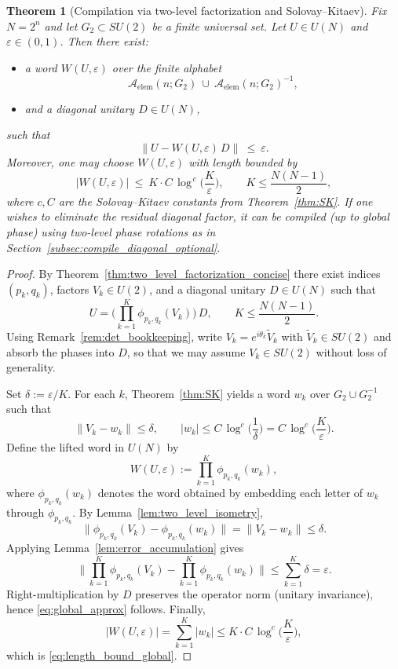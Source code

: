 \documentclass[10pt,a4paper]{amsart}
\newtheorem{theorem}{Theorem}
\begin{document}
\begin{theorem}[Compilation via two-level factorization and Solovay--Kitaev]
\label{thm:UN_compilation_SK}
Fix $N=2^n$ and let $G_2\subset SU(2)$ be a finite universal set.
Let $U\in U(N)$ and $\varepsilon\in(0,1)$. Then there exist:
\begin{itemize}
\item a word $W(U,\varepsilon)$ over the finite alphabet
\[
\mathcal{A}_{\mathrm{elem}}(n;G_2)\ \cup\ \mathcal{A}_{\mathrm{elem}}(n;G_2)^{-1},
\]
\item and a diagonal unitary $D\in U(N)$,
\end{itemize}
such that
\begin{equation}\label{eq:global_approx}
\big\|U - W(U,\varepsilon)\,D\big\|\ \le\ \varepsilon.
\end{equation}
Moreover, one may choose $W(U,\varepsilon)$ with length bounded by
\begin{equation}\label{eq:length_bound_global}
|W(U,\varepsilon)|\ \le\ K\cdot C\,\log^{\,c}\!\Big(\frac{K}{\varepsilon}\Big),
\qquad
K\le \frac{N(N-1)}{2},
\end{equation}
where $c,C$ are the Solovay--Kitaev constants from Theorem~\ref{thm:SK}.
If one wishes to eliminate the residual diagonal factor, it can be compiled (up to global phase) using two-level phase rotations as in
Section~\ref{subsec:compile_diagonal_optional}.
\end{theorem}

\begin{proof}
By Theorem~\ref{thm:two_level_factorization_concise} there exist indices $(p_k,q_k)$, factors $V_k\in U(2)$, and a diagonal unitary $D\in U(N)$
such that
\[
U=\Big(\prod_{k=1}^K \phi_{p_k,q_k}(V_k)\Big)\,D,
\qquad
K\le \frac{N(N-1)}{2}.
\]
Using Remark~\ref{rem:det_bookkeeping}, write $V_k=e^{i\theta_k}\widetilde V_k$ with $\widetilde V_k\in SU(2)$ and absorb the phases
into $D$, so that we may assume $V_k\in SU(2)$ without loss of generality.

Set $\delta:=\varepsilon/K$. For each $k$, Theorem~\ref{thm:SK} yields a word $w_k$ over $G_2\cup G_2^{-1}$ such that
\[
\|V_k-w_k\|\le \delta,
\qquad
|w_k|\le C\,\log^{c}\!\Big(\frac{1}{\delta}\Big)=C\,\log^{c}\!\Big(\frac{K}{\varepsilon}\Big).
\]
Define the lifted word in $U(N)$ by
\[
W(U,\varepsilon):=\prod_{k=1}^K \phi_{p_k,q_k}(w_k),
\]
where $\phi_{p_k,q_k}(w_k)$ denotes the word obtained by embedding each letter of $w_k$ through $\phi_{p_k,q_k}$.
By Lemma~\ref{lem:two_level_isometry},
\[
\big\|\phi_{p_k,q_k}(V_k)-\phi_{p_k,q_k}(w_k)\big\|
=
\|V_k-w_k\|
\le \delta.
\]
Applying Lemma~\ref{lem:error_accumulation} gives
\[
\Big\|\prod_{k=1}^K\phi_{p_k,q_k}(V_k)-\prod_{k=1}^K\phi_{p_k,q_k}(w_k)\Big\|
\le
\sum_{k=1}^K \delta
=
\varepsilon.
\]
Right-multiplication by $D$ preserves the operator norm (unitary invariance), hence \eqref{eq:global_approx} follows.
Finally,
\[
|W(U,\varepsilon)|
=\sum_{k=1}^K |w_k|
\le
K\cdot C\,\log^{c}\!\Big(\frac{K}{\varepsilon}\Big),
\]
which is \eqref{eq:length_bound_global}.
\end{proof}
\end{document}

